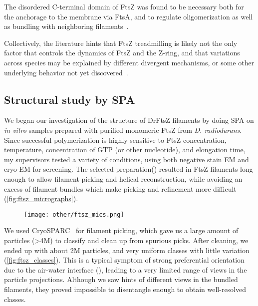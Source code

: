 The disordered C-terminal domain of FtsZ was found to be necessary both for the anchorage to the membrane via FtsA, and to regulate oligomerization as well as bundling with neighboring filaments~\cite{barrowsFtsZDynamicsBacterial2021}.

Collectively, the literature hints that FtsZ treadmilling is likely not the only factor that controls the dynamics of FtsZ and the Z-ring, and that variations across species may be explained by different divergent mechanisms, or some other underlying behavior not yet discovered~\cite{barrowsFtsZDynamicsBacterial2021}.

\subsection{Structural study by SPA}

We began our investigation of the structure of DrFtsZ filaments by doing SPA on \textit{in vitro} samples prepared with purified monomeric FtsZ from \textit{D. radiodurans}.
Since successful polymerization is highly sensitive to FtsZ concentration, temperature, concentration of GTP (or other nucleotide), and elongation time, my supervisors tested a variety of conditions, using both negative stain EM and cryo-EM for screening.
The selected preparation() resulted in FtsZ filaments long enough to allow filament picking and helical reconstruction, while avoiding an excess of filament bundles which make picking and refinement more difficult (\autoref{fig:ftsz_micrographs}).

\begin{figure}[ht]
    \centering
    \texttt{[image: other/ftsz\_mics.png]}
    \label{fig:ftsz_micrographs}
\end{figure}

We used CryoSPARC~\cite{punjaniCryoSPARCAlgorithmsRapid2017} for filament picking, which gave us a large amount of particles (>4M) to classify and clean up from spurious picks.
After cleaning, we ended up with about 2M particles, and very uniform classes with little variation (\autoref{fig:ftsz_classes}).
This is a typical symptom of strong preferential orientation due to the air-water interface (), leading to a very limited range of views in the particle projections.
Although we saw hints of different views in the bundled filaments, they proved impossible to disentangle enough to obtain well-resolved classes.

